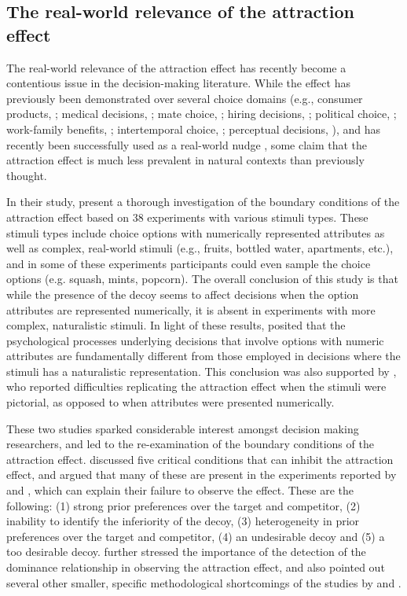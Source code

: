 \documentclass[11pt,a4paper]{article}
\begin{document}
\subsection{The real-world relevance of the attraction effect}

The real-world relevance of the attraction effect has recently become a contentious issue in the decision-making literature. While the effect has previously been demonstrated over several choice domains (e.g., consumer products, ; medical decisions, ; mate choice, ; hiring decisions, ; political choice, ; work-family benefits, ; intertemporal choice, ; perceptual decisions, ), and has recently been successfully used as a real-world nudge \cite{Li2018}, some claim that the attraction effect is much less prevalent in natural contexts than previously thought.

In their study,  present a thorough investigation of the boundary conditions of the attraction effect based on 38 experiments with various stimuli types. These stimuli types include choice options with numerically represented attributes as well as complex, real-world stimuli (e.g., fruits, bottled water, apartments, etc.), and  in some of these experiments participants could even sample the choice options (e.g. squash, mints, popcorn). The overall conclusion of this study is that while the presence of the decoy seems to affect decisions when the option attributes are represented numerically, it is absent in experiments with more complex, naturalistic stimuli. In light of these results, \citeauthor{Frederick2014} posited that the psychological processes underlying decisions that involve options with numeric attributes are fundamentally different from those employed in decisions where the stimuli has a naturalistic representation. This conclusion was also supported by , who reported difficulties replicating the attraction effect when the stimuli were pictorial, as opposed to when attributes were presented numerically.


These two studies sparked considerable interest amongst decision making researchers, and led to the re-examination of the boundary conditions of the attraction effect.  discussed five critical conditions that can inhibit the attraction effect, and argued that many of these are present in the experiments reported by \citeauthor{Frederick2014} and \citeauthor{Yang2014}, which can explain their failure to observe the effect. These are the following: (1) strong prior preferences over the target and competitor, (2) inability to identify the inferiority of the decoy, (3) heterogeneity in prior preferences over the target and competitor, (4) an undesirable decoy and (5) a too desirable decoy.  further stressed the importance of the detection of the dominance relationship in observing the attraction effect, and also pointed out several other smaller, specific methodological shortcomings of the studies by \citeauthor{Frederick2014} and \citeauthor{Yang2014}. 
\end{document}

